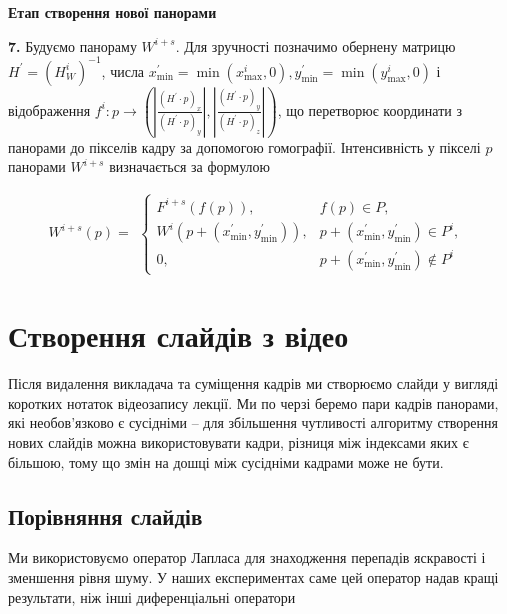 \begin{algorithm}[H]
\begin{algorithmic}
        \textbf{Етап створення нової панорами}
        
        \textbf{7.}
        Будуємо панораму $W^{i+s}$. Для зручності позначимо обернену матрицю $H^{'} = (H_{W}^{i})^{-1}$, числа
        $x_{\min}^{'} = \min(x_{\max}^{i}, 0), y_{\min}^{'} = \min(y_{\max}^{i}, 0)$ і відображення
        $f^i: p \rightarrow
            (|\frac{(H^{'} \cdot p)_x}{(H^{'} \cdot p)_y}|, |\frac{(H^{'} \cdot p)_y}{(H^{'} \cdot p)_z}|)$, що перетворює
        координати з панорами до пікселів кадру за допомогою гомографії. Інтенсивність у пікселі $p$ панорами
        $W^{i+s}$ визначається за формулою

        \begin{equation}
            W^{i + s}(p) =
            \begin{gathered}
                \begin{cases}
                    F^{i + s}(f(p)),                            & f(p) \in P,                                    \\
                    W^{i}( p + ( x_{\min}^{'},y_{\min}^{'} ) ), & p + ( x_{\min}^{'},y_{\min}^{'} ) \in P^{i},   \\
                    0,                                          & p + ( x_{\min}^{'},y_{\min}^{'} ) \notin P^{i}
                \end{cases}
            \end{gathered}
        \end{equation}
    \end{algorithmic}
\end{algorithm}


\section{Створення слайдів з відео}

Після видалення викладача та суміщення кадрів ми створюємо слайди у вигляді
коротких нотаток відеозапису лекції. Ми по черзі беремо пари кадрів панорами, які
необов'язково є сусідніми – для збільшення чутливості алгоритму створення нових
слайдів можна використовувати кадри, різниця між індексами яких є більшою, тому що
змін на дошці між сусідніми кадрами може не бути.


\subsection{Порівняння слайдів}


Ми використовуємо оператор Лапласа  для знаходження перепадів
яскравості і зменшення рівня шуму. У наших експериментах саме цей
оператор надав кращі результати, ніж інші диференціальні оператори

